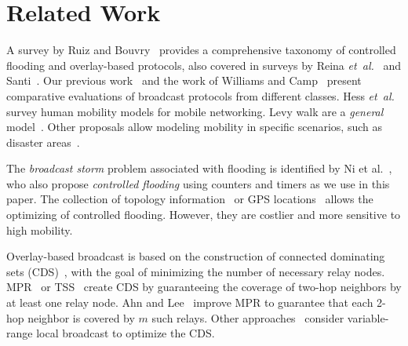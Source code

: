 
\section{Related Work}
\label{sec:related}


A survey by Ruiz and Bouvry~\citep{ruiz2015survey} provides a comprehensive taxonomy of controlled flooding and overlay-based protocols, also covered in surveys by Reina \emph{et~al.}~\citep{Reina2015} and Santi~\citep{Santi:2005:TCW:1089733.1089736}.
%
Our previous work~\citep{DensityMobDrivenEval} and the work of Williams and Camp~\citep{Williams2002} present comparative evaluations of broadcast protocols from different classes.
Hess \emph{et~al.}~\citep{Hess:2015:DHM:2856149.2840722} survey human mobility models for mobile networking.
Levy walk are a \emph{general} model~\citep{rhee2011levy}.
Other proposals allow modeling mobility in specific scenarios, such as disaster areas~\citep{Aschenbruck2009}.

The \emph{broadcast storm} problem associated with flooding is identified by Ni et al.~\citep{BroadcastStormProblem}, who also propose \emph{controlled flooding} using counters and timers as we use in this paper.
The collection of topology information~\citep{ProbFlood} or GPS locations~\citep{abba} allows the optimizing of controlled flooding. However, they are costlier and more sensitive to high mobility.

Overlay-based broadcast is based on the construction of connected dominating sets (CDS)~\citep{stojmenovic-cds}, with the goal of minimizing the number of necessary relay nodes.
MPR~\citep{mpr} or TSS~\citep{Nikolov2015} create CDS by guaranteeing the coverage of two-hop neighbors by at least one relay node.
Ahn and Lee~\citep{mpr-improvement} improve MPR to guarantee that each 2-hop neighbor is covered by $m$ such relays.
Other approaches~\citep{woon2011variable,park2013efficient} consider variable-range local broadcast to optimize the CDS.

